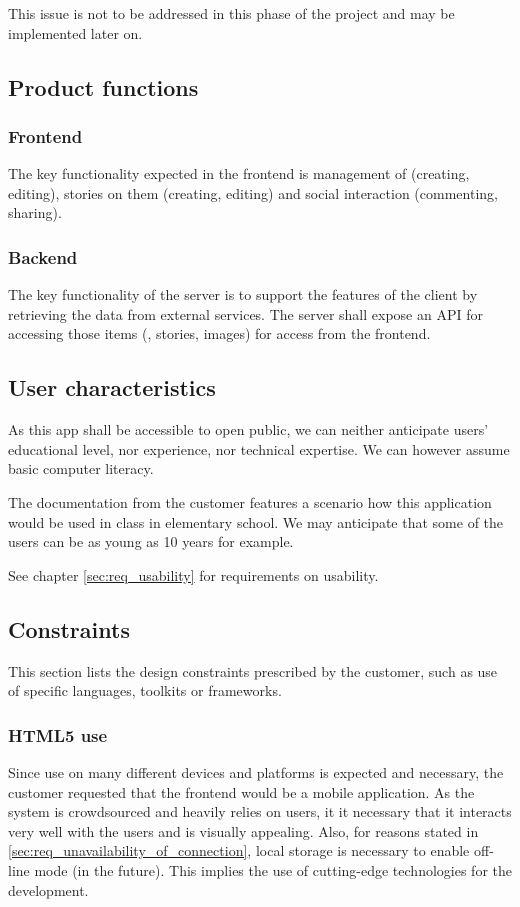 \documentclass[11pt]{book}
\begin{document}
This issue is not to be addressed in this phase of the project and may be implemented later on.

\subsection{Product functions}

\subsubsection{Frontend}
The key functionality expected in the frontend is management of \wallentityp (creating, editing), stories on them (creating, editing) and social interaction (commenting, sharing).

\subsubsection{Backend}
The key functionality of the server is to support the features of the client by retrieving the data from external services. The server shall expose an API for accessing those items (\wallentityp, stories, images) for access from the frontend.

\subsection{User characteristics} \label{sec:req_user_characteristics}
As this app shall be accessible to open public, we can neither anticipate users' educational level, nor experience, nor technical expertise. We can however assume basic computer literacy.

The documentation from the customer features a scenario how this application would be used in class in elementary school. We may anticipate that some of the users can be as young as 10 years for example.

See chapter \ref{sec:req_usability} for requirements on usability.

\subsection{Constraints}

This section lists the design constraints prescribed by the customer, such as use of specific languages, toolkits or frameworks.

\subsubsection{HTML5 use}
Since use on many different devices and platforms is expected and necessary, the customer requested that the frontend would be a mobile application. As the system is crowdsourced and heavily relies on users, it it necessary that it interacts very well with the users and is visually appealing. Also, for reasons stated in \ref{sec:req_unavailability_of_connection}, local storage is necessary to enable off-line mode (in the future). This implies the use of cutting-edge technologies for the development.
\end{document}
